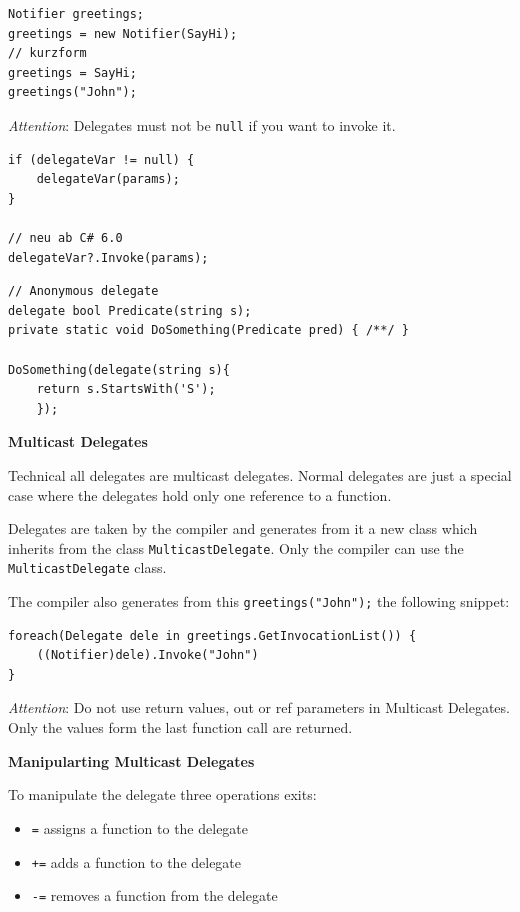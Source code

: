 \documentclass[11pt,twoside,landscape]{article}
\begin{document}
\begin{multicols}{3}
\begin{lstlisting}
Notifier greetings;
greetings = new Notifier(SayHi);
// kurzform
greetings = SayHi;
greetings("John");
\end{lstlisting}

\emph{Attention}: Delegates must not be \texttt{null} if you want to invoke it.
\lstset{language=csharp,label= ,caption= ,captionpos=b,numbers=none}
\begin{lstlisting}
if (delegateVar != null) {
    delegateVar(params);
}

// neu ab C# 6.0
delegateVar?.Invoke(params);
\end{lstlisting}

\lstset{language=csharp,label= ,caption= ,captionpos=b,numbers=none}
\begin{lstlisting}
// Anonymous delegate
delegate bool Predicate(string s);
private static void DoSomething(Predicate pred) { /**/ }

DoSomething(delegate(string s){
	return s.StartsWith('S');
    });
\end{lstlisting}


\textbf{Multicast Delegates}

Technical all delegates are multicast delegates. Normal delegates are just a special case where the delegates hold only one reference to a function.

Delegates are taken by the compiler and generates from it a new class which inherits from the class \texttt{MulticastDelegate}. Only the compiler can use the \texttt{MulticastDelegate} class.

The compiler also generates from this \texttt{greetings("John");} the following snippet:
\lstset{language=csharp,label= ,caption= ,captionpos=b,numbers=none}
\begin{lstlisting}
foreach(Delegate dele in greetings.GetInvocationList()) {
    ((Notifier)dele).Invoke("John")
}
\end{lstlisting}

\emph{Attention}: Do not use return values, out or ref parameters in Multicast Delegates.
Only the values form the last function call are returned. 


\textbf{Manipularting Multicast Delegates}

To manipulate the delegate three operations exits:
\begin{itemize}
\item \texttt{=} assigns a function to the delegate
\item \texttt{+=} adds a function to the delegate
\item \texttt{-=} removes a function from the delegate
\end{itemize}



\end{multicols}
\end{document}
